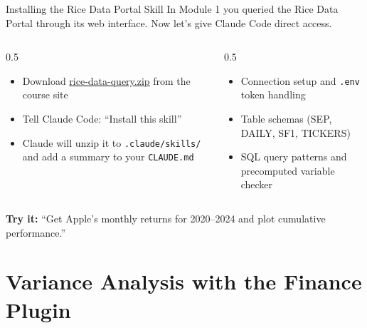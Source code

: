 \documentclass[aspectratio=169]{beamer}
\begin{document}
\begin{frame}[fragile]{Installing the Rice Data Portal Skill}
In Module 1 you queried the Rice Data Portal through its web interface.  Now let's give Claude Code direct access.

\vspace{0.3cm}
\begin{columns}[T]
\begin{column}{0.5\textwidth}
\begin{shadedbox}[title=\textbf{Quick Install}]
\begin{itemize}\small
  \item Download \href{https://mgmt675.kerryback.com/files/rice-data-query.zip}{rice-data-query.zip} from the course site
  \item Tell Claude Code: ``Install this skill''
  \item Claude will unzip it to \texttt{.claude/skills/} and add a summary to your \texttt{CLAUDE.md}
\end{itemize}
\end{shadedbox}
\end{column}
\begin{column}{0.5\textwidth}
\begin{shadedbox}[title=\textbf{What It Provides}]
\begin{itemize}\small
  \item Connection setup and \texttt{.env} token handling
  \item Table schemas (SEP, DAILY, SF1, TICKERS)
  \item SQL query patterns and precomputed variable checker
\end{itemize}
\end{shadedbox}
\end{column}
\end{columns}

\vspace{0.3cm}
\textbf{Try it:} ``Get Apple's monthly returns for 2020--2024 and plot cumulative performance.''
\end{frame}

\section{Variance Analysis with the Finance Plugin}
\end{document}
